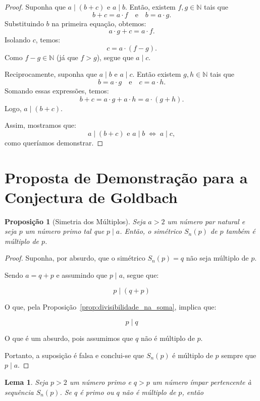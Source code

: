 \documentclass[a4paper,11pt]{article}
\newtheorem{lemma}[theorem]{Lema}
\newtheorem{proposition}[theorem]{Proposição}
\theoremstyle{definition}
\theoremstyle{remark}
\begin{document}
\begin{otherlanguage}{brazil}
	\begin{proof}
		Suponha que \( a \mid (b + c) \) e \( a \mid b \). Então, existem \( f, g \in \mathbb{N} \) tais que
		\[
		b + c = a \cdot f \quad \text{e} \quad b = a \cdot g.
		\]
		Substituindo \( b \) na primeira equação, obtemos:
		\[
		a \cdot g + c = a \cdot f.
		\]
		Isolando \( c \), temos:
		\[
		c = a \cdot (f - g).
		\]
		Como \( f - g \in \mathbb{N} \) (já que \( f > g \)), segue que \( a \mid c \).
		
		Reciprocamente, suponha que \( a \mid b \) e \( a \mid c \). Então existem \( g, h \in \mathbb{N} \) tais que
		\[
		b = a \cdot g \quad \text{e} \quad c = a \cdot h.
		\]
		Somando essas expressões, temos:
		\[
		b + c = a \cdot g + a \cdot h = a \cdot (g + h).
		\]
		Logo, \( a \mid (b + c) \).
		
		Assim, mostramos que:
		\[
		a \mid (b + c) \text{ e } a \mid b \;\Longleftrightarrow\; a \mid c,
		\]
		como queríamos demonstrar.
	\end{proof}
	
	
	\section{Proposta de Demonstração para a Conjectura de Goldbach}
	\begin{proposition}[Simetria dos Múltiplos]\label{prop:simetria_dos_multiplos}
		Seja \(a > 2\) um número par natural e seja \(p\) um número primo tal que \(p \mid a\). Então, o simétrico \(S_n(p)\) de \(p\) também é múltiplo de \(p\).
	\end{proposition}
	
	\begin{proof}
		Suponha, por absurdo, que o simétrico \(S_n(p) = q\) não seja múltiplo de \(p\). 
		
		Sendo \(a = q + p\) e assumindo que \(p \mid a\), segue que:
		
		\[
		p \mid (q + p)
		\]
		
		O que, pela Proposição~\ref{prop:divisibilidade_na_soma}, implica que:
		
		\[
		p \mid q
		\]
		
		O que é um absurdo, pois assumimos que \(q\) não é múltiplo de \(p\).
		
		Portanto, a suposição é falsa e conclui-se que \(S_n(p)\) é múltiplo de \(p\) sempre que \(p \mid a\).
	\end{proof}
	
	\begin{lemma}\label{lema:multip}
		Seja \(p > 2\) um número primo e \(q > p\) um número ímpar pertencente à sequência \(S_n(p)\). Se \(q\) é primo ou \(q\) não é múltiplo de \(p\), então
		

\end{lemma}
\end{otherlanguage}
\end{document}
